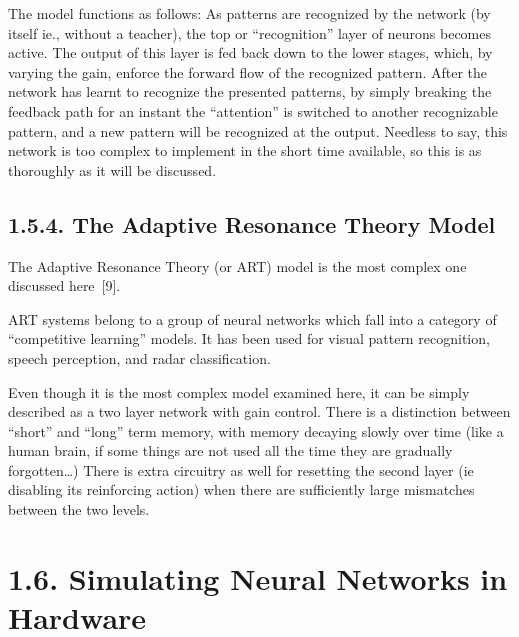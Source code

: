 \documentclass[12pt]{report}
\begin{document}
The model functions as follows: As patterns are recognized by the
network (by itself ie., without a teacher), the top or ``recognition''
layer of neurons becomes active.
The output of this layer is fed back down to the lower stages, which, by
varying the gain, enforce the forward flow of the recognized pattern.
After the network has learnt to recognize the presented patterns, by
simply breaking the feedback path for an instant the ``attention'' is
switched to another recognizable pattern, and a new pattern will be
recognized at the output.
Needless to say, this network is too complex to implement in the short
time available, so this is as thoroughly as it will be discussed.

\subsection{1.5.4. The Adaptive Resonance Theory Model}

The Adaptive Resonance Theory (or ART) model is the most complex one
discussed here~[9].

ART systems belong to a group of neural networks which fall into a category of
``competitive learning'' models.
It has been used for visual pattern recognition, speech perception, and
radar classification.

Even though it is the most complex model examined here, it can be
simply described as a two layer network with gain control.
There is a distinction between ``short'' and ``long'' term memory, with
memory decaying slowly over time (like a human brain, if some things are not
used all the time they are gradually forgotten\dots)
There is extra circuitry as well for resetting the second layer (ie
disabling its reinforcing action) when there are sufficiently large
mismatches between the two levels.

\section{1.6. Simulating Neural Networks in Hardware}
\end{document}
